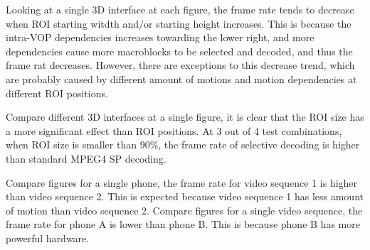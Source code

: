 Looking at a single 3D interface at each figure, the frame rate tends to decrease when ROI starting witdth and/or starting height increases. This is because the intra-VOP dependencies increases towarding the lower right, and more dependencies cause more macroblocks to be selected and decoded, and thus the frame rat decreases. However, there are exceptions to this decrease trend, which are probably caused by different amount of motions and motion dependencies at different ROI positions. 

Compare different 3D interfaces at a single figure, it is clear that the ROI size has a more significant effect than ROI positions. At 3 out of 4 test combinations, when ROI size is smaller than 90\%, the frame rate of selective decoding is higher than standard MPEG4 SP decoding. 

Compare figures for a single phone, the frame rate for video sequence 1 is higher than video sequence 2. This is expected because video sequence 1 has less amount of motion than video sequence 2. Compare figures for a single video sequence, the frame rate for phone A is lower than phone B. This is because phone B has more powerful hardware. 

